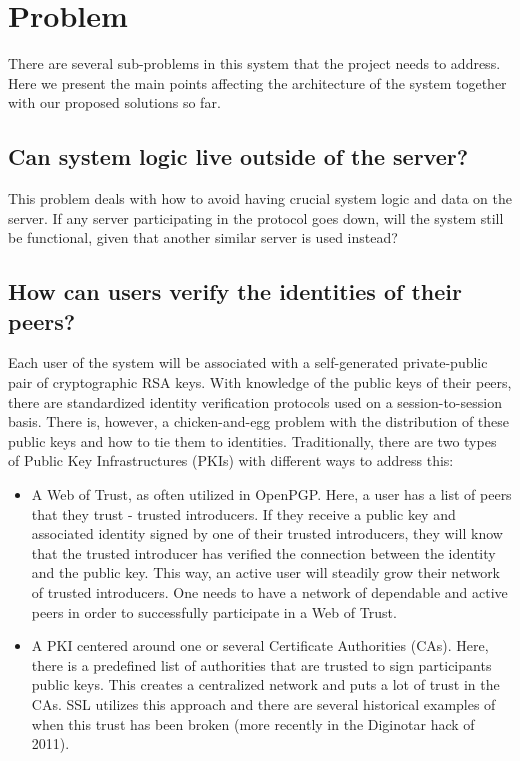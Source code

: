 \section{Problem}
There are several sub-problems in this system that the project needs to address. Here we present the main points affecting the architecture of the system together with our proposed solutions so far.
\subsection{Can system logic live outside of the server?}
This problem deals with how to avoid having crucial system logic and data on the server. If any server participating in the protocol goes down, will the system still be functional, given that another similar server is used instead?
\subsection{How can users verify the identities of their peers?}
Each user of the system will be associated with a self-generated private-public pair of cryptographic RSA keys. With knowledge of the public keys of their peers, there are standardized identity verification protocols used on a session-to-session basis. There is, however, a chicken-and-egg problem with the distribution of these public keys and how to tie them to identities. Traditionally, there are two types of Public Key Infrastructures (PKIs) with different ways to address this:
\begin{itemize}
\item A Web of Trust, as often utilized in OpenPGP. Here, a user has a list of peers that they trust - trusted introducers. If they receive a public key and associated identity signed by one of their trusted introducers, they will know that the trusted introducer has verified the connection between the identity and the public key. This way, an active user will steadily grow their network of trusted introducers. One needs to have a network of dependable and active peers in order to successfully participate in a Web of Trust.
\item A PKI centered around one or several Certificate Authorities (CAs). Here, there is a predefined list of authorities that are trusted to sign participants public keys. This creates a centralized network and puts a lot of trust in the CAs. SSL utilizes this approach and there are several historical examples of when this trust has been broken (more recently in the Diginotar hack of 2011).
\end{itemize}
